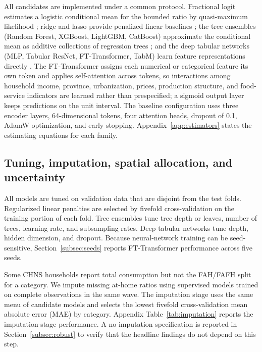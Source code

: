 \documentclass[preprint,12pt,authoryear]{elsarticle}
\begin{document}
All candidates are implemented under a common protocol. Fractional logit estimates a logistic conditional mean for the bounded ratio by quasi-maximum likelihood \citep{PapkeWooldridge1996}; ridge and lasso provide penalized linear baselines \citep{Hoerl1970Ridge, Tibshirani1996}; the tree ensembles (Random Forest, XGBoost, LightGBM, CatBoost) approximate the conditional mean as additive collections of regression trees \citep{Breiman2001, ChenGuestrin2016, KeEtAl2017, ProkhorenkovaEtAl2018}; and the deep tabular networks (MLP, Tabular ResNet, FT-Transformer, TabM) learn feature representations directly \citep{GoodfellowEtAl2016, GorishniyEtAl2021, RubachevEtAl2024}. The FT-Transformer assigns each numerical or categorical feature its own token and applies self-attention across tokens, so interactions among household income, province, urbanization, prices, production structure, and food-service indicators are learned rather than prespecified; a sigmoid output layer keeps predictions on the unit interval. The baseline configuration uses three encoder layers, 64-dimensional tokens, four attention heads, dropout of 0.1, AdamW optimization, and early stopping. Appendix~\ref{app:estimators} states the estimating equations for each family.

\subsection{Tuning, imputation, spatial allocation, and uncertainty}

All models are tuned on validation data that are disjoint from the test folds. Regularized linear penalties are selected by fivefold cross-validation on the training portion of each fold. Tree ensembles tune tree depth or leaves, number of trees, learning rate, and subsampling rates. Deep tabular networks tune depth, hidden dimension, and dropout. Because neural-network training can be seed-sensitive, Section~\ref{subsec:seeds} reports FT-Transformer performance across five seeds.

Some CHNS households report total consumption but not the FAH/FAFH split for a category. We impute missing at-home ratios using supervised models trained on complete observations in the same wave. The imputation stage uses the same menu of candidate models and selects the lowest fivefold cross-validation mean absolute error (MAE) by category. Appendix Table~\ref{tab:imputation} reports the imputation-stage performance. A no-imputation specification is reported in Section~\ref{subsec:robust} to verify that the headline findings do not depend on this step.
\end{document}

